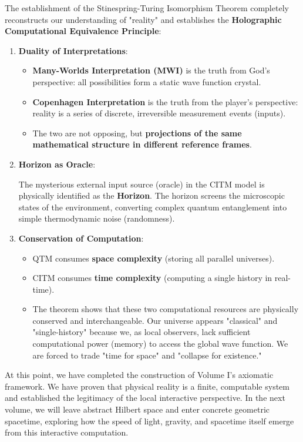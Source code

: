 The establishment of the Stinespring-Turing Isomorphism Theorem completely reconstructs our understanding of "reality" and establishes the \textbf{Holographic Computational Equivalence Principle}:

\begin{enumerate}
\item \textbf{Duality of Interpretations}:

\begin{itemize}
\item \textbf{Many-Worlds Interpretation (MWI)} is the truth from God's perspective: all possibilities form a static wave function crystal.

\item \textbf{Copenhagen Interpretation} is the truth from the player's perspective: reality is a series of discrete, irreversible measurement events (inputs).

\item The two are not opposing, but \textbf{projections of the same mathematical structure in different reference frames}.
\end{itemize}

\item \textbf{Horizon as Oracle}:

The mysterious external input source (oracle) in the CITM model is physically identified as the \textbf{Horizon}. The horizon screens the microscopic states of the environment, converting complex quantum entanglement into simple thermodynamic noise (randomness).

\item \textbf{Conservation of Computation}:

\begin{itemize}
\item QTM consumes \textbf{space complexity} (storing all parallel universes).

\item CITM consumes \textbf{time complexity} (computing a single history in real-time).

\item The theorem shows that these two computational resources are physically conserved and interchangeable. Our universe appears "classical" and "single-history" because we, as local observers, lack sufficient computational power (memory) to access the global wave function. We are forced to trade "time for space" and "collapse for existence."
\end{itemize}
\end{enumerate}

At this point, we have completed the construction of Volume I's axiomatic framework. We have proven that physical reality is a finite, computable system and established the legitimacy of the local interactive perspective. In the next volume, we will leave abstract Hilbert space and enter concrete geometric spacetime, exploring how the speed of light, gravity, and spacetime itself emerge from this interactive computation.

